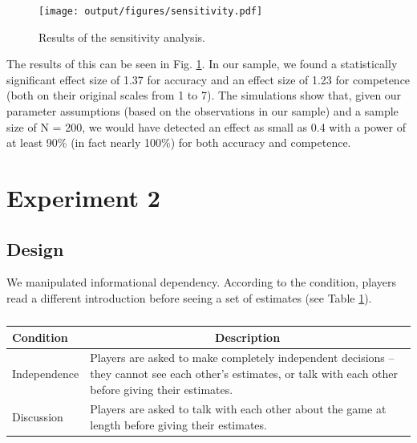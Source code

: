 \documentclass[
  doc,floatsintext]{apa6}
\begin{document}
\begin{figure}
\centering
\texttt{[image: output/figures/sensitivity.pdf]}
\caption{\label{fig:sensitivity}Results of the sensitivity analysis.}
\end{figure}

The results of this can be seen in Fig. \ref{fig:sensitivity}. In our sample, we found a statistically significant effect size of 1.37 for accuracy and an effect size of 1.23 for competence (both on their original scales from 1 to 7). The simulations show that, given our parameter assumptions (based on the observations in our sample) and a sample size of N = 200, we would have detected an effect as small as 0.4 with a power of at least 90\% (in fact nearly 100\%) for both accuracy and competence.

\clearpage

\section{Experiment 2}\label{exp2}

\subsection{Design}\label{design-6}

\FloatBarrier

We manipulated informational dependency. According to the condition, players read a different introduction before seeing a set of estimates (see Table \ref{tab:exp2-conditions}).

\begin{table}[tbp]

\begin{center}
\begin{threeparttable}

\caption{\label{tab:exp2-conditions}}

\begin{tabular}{m{3cm}m{12cm}}
\toprule
Condition & \multicolumn{1}{c}{Description}\\
\midrule
Independence & Players are asked to make completely independent decisions – they cannot see each other’s estimates, or talk with each other before giving their estimates.\\
Discussion & Players are asked to talk with each other about the game at length before giving their estimates.\\
\bottomrule
\end{tabular}

\end{threeparttable}
\end{center}

\end{table}
\end{document}
